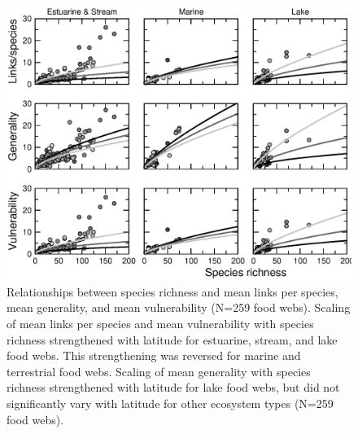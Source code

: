 \documentclass[12pt]{article}
\begin{document}
\begin{figure}[!h]
\label{scalingfig}
\includegraphics[width=.9\textwidth]{Figures/nonts_scaling_with_S_grey.eps}
\caption{Relationships between species richness and mean links per species, mean generality, and mean 
vulnerability (N=259 food webs). Scaling of mean links per species and mean vulnerability with species 
richness strengthened with latitude for estuarine, stream, and lake food webs. This strengthening was
reversed for marine and terrestrial food webs. Scaling of mean generality with species richness 
strengthened with latitude for lake food webs, but did not significantly vary with latitude for other
ecosystem types (N=259 food webs). }
\end{figure}
\end{document}
